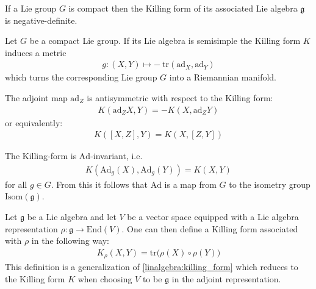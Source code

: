 	\begin{property}
		If a Lie group $G$ is compact then the Killing form of its associated Lie algebra $\mathfrak{g}$ is negative-definite.
	\end{property}
	\begin{result}
		Let $G$ be a compact Lie group. If its Lie algebra is semisimple the Killing form $K$ induces a metric
                \begin{gather}
                	g:(X, Y)\mapsto -\ \text{tr}(\text{ad}_X, \text{ad}_Y)
                \end{gather}
                which turns the corresponding Lie group $G$ into a Riemannian manifold.
	\end{result}
            
	\begin{property}
		The adjoint map $\text{ad}_Z$ is antisymmetric with respect to the Killing form:
		\begin{gather}
			\label{lie:ad_killing_form}
			K(\text{ad}_ZX, Y) = -K(X, \text{ad}_ZY)
		\end{gather}
		or equivalently:
		\begin{gather}
			K([X, Z], Y) = K(X, [Z, Y])
		\end{gather}
	\end{property}
	\begin{property}
		The Killing-form is $\text{Ad}$-invariant, i.e.
                \begin{gather}
                    K(\text{Ad}_g(X), \text{Ad}_g(Y)) = K(X, Y)
		\end{gather}
                for all $g\in G$. From this it follows that $\text{Ad}$ is a map from $G$ to the isometry group $\text{Isom}(\mathfrak{g})$.
	\end{property}
	
	\begin{construct}
		Let $\mathfrak{g}$ be a Lie algebra and let $V$ be a vector space equipped with a Lie algebra representation $\rho:\mathfrak{g}\rightarrow\text{End}(V)$. One can then define a Killing form associated with $\rho$ in the following way:
		\begin{gather}
			\label{lie:rho_killing_form}
			K_\rho(X, Y) = \text{tr}\Big(\rho(X)\circ\rho(Y)\Big)
		\end{gather}
		This definition is a generalization of \ref{linalgebra:killing_form} which reduces to the Killing form $K$ when choosing $V$ to be $\mathfrak{g}$ in the adjoint representation.
	\end{construct}
	
